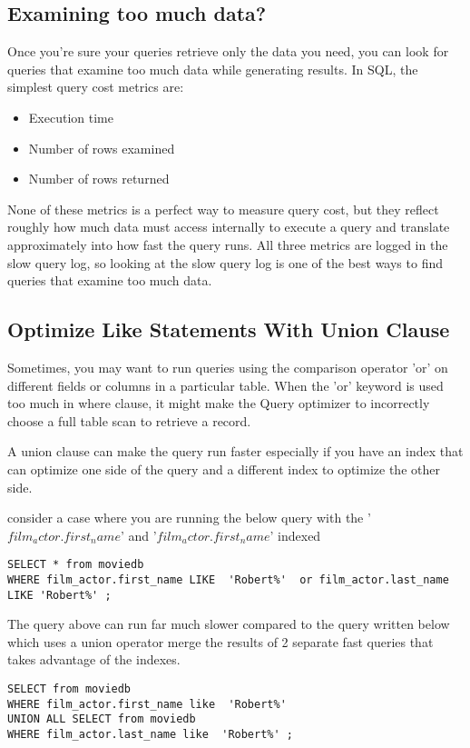 \documentclass[paper=letter, fontsize=12pt]{article}
\begin{document}
\subsection{Examining too much data?}
Once you’re sure your queries retrieve only the data you need, you can look for queries that examine too much data while generating results. In SQL, the simplest query cost metrics are:
\begin{itemize}
	\item Execution time
	\item Number of rows examined
	\item Number of rows returned
\end{itemize}
None of these metrics is a perfect way to measure query cost, but they reflect roughly how much data must access internally to execute a query and translate approximately into how fast the query runs. All three metrics are logged in the slow query log, so looking at the slow query log is one of the best ways to find queries that examine too much data.

\subsection{Optimize Like Statements With Union Clause}
Sometimes, you may want to run queries using the comparison operator 'or' on different fields or columns in a particular table. When the 'or' keyword is used too much in where clause, it might make the Query optimizer to incorrectly choose a full table scan to retrieve a record.

A union clause can make the query run faster especially if you have an index that can optimize one side of the query and a different index to optimize the other side.

consider a case where you are running the below query with the '$film_actor.first_name$' and '$film_actor.first_name$' indexed
\begin{verbatim}
SELECT * from moviedb 
WHERE film_actor.first_name LIKE  'Robert%'  or film_actor.last_name LIKE 'Robert%' ;
\end{verbatim}
The query above can run far much slower compared to the query written below which uses a union operator merge the results of 2 separate fast queries that takes advantage of the indexes.
\begin{verbatim}
SELECT from moviedb 
WHERE film_actor.first_name like  'Robert%' 
UNION ALL SELECT from moviedb 
WHERE film_actor.last_name like  'Robert%' ;
\end{verbatim}
\end{document}

